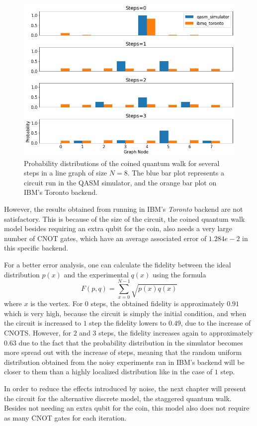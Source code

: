 \documentclass[../../dissertation.tex]{subfiles}
\begin{document}
\begin{figure}[!h]
	\centering
	\includegraphics[scale=0.40]{img/Qiskit/CoinedQuantumWalk/CoinedQW_N3_S0123.png}
	\caption{Probability distributions of the coined quantum walk for several steps in a line graph of size $N=8$. The blue bar plot represents a circuit run in the QASM simulator, and the orange bar plot on IBM's Toronto backend.} 
	\label{fig:coinedQWQiskitDist}
\end{figure}
However, the results obtained from running in IBM's \textit{Toronto} backend
are not satisfactory. This is because of the size of the circuit, the coined
quantum walk model besides requiring an extra qubit for the coin, also needs a
very large number of CNOT gates, which have an average associated error of
$1.284e-2$ in this specific backend.\par

For a better error analysis, one can calculate the fidelity between the
ideal distribution $p(x)$ and the experimental $q(x)$ using the formula
\begin{equation}
    F(p,q) = \sum_{x=0}^{N-1} \sqrt{p(x)q(x)}
    \label{eq:bestFid}
\end{equation}
where $x$ is the vertex. For $0$ steps, the obtained fidelity is approximately
$0.91$ which is very high, because the circuit is simply the initial condition,
and when the circuit is increased to $1$ step the fidelity lowers to $0.49$,
due to the increase of CNOTS. However, for $2$ and $3$ steps, the fidelity
increases again to approximately $0.63$ due to the fact that the probability
distribution in the simulator becomes more spread out with the increase of
steps, meaning that the random uniform distribution obtained from the noisy
experiments ran in IBM's backend will be closer to them than a highly localized
distribution like in the case of $1$ step.\par

In order to reduce the effects introduced by noise, the next chapter will
present the circuit for the alternative discrete model, the staggered quantum
walk. Besides not needing an extra qubit for the coin, this model also does not
require as many CNOT gates for each iteration.
\end{document}
